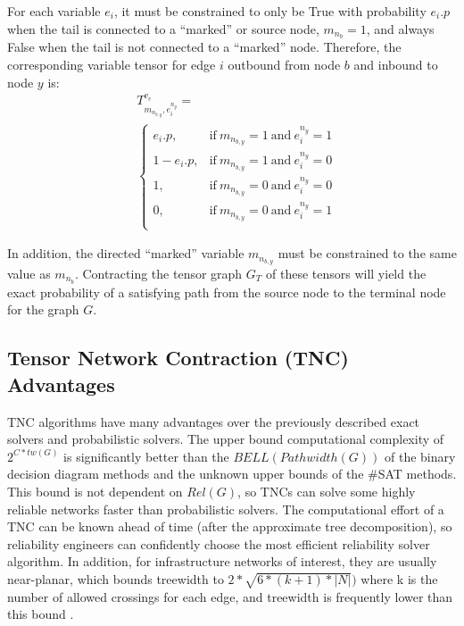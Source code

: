 For each variable \(e_i\), it must be constrained to only be True with probability \(e_i.p\) when the tail is connected to a ``marked'' or source node, \(m_{n_b}=1\), and always False when the tail is not connected to a ``marked'' node. Therefore, the corresponding variable tensor for edge \(i\) outbound from node \(b\) and inbound to node \(y\) is: \begin{equation*}
\begin{split}
& T^{v_e}_{m_{n_{b,y}},e_i^{n_y}}= \\
& \begin{cases}
  e_i.p, & \text{if}\ m_{n_{b,y}}=1\ \text{and}\ e_i^{n_y}=1 \\
  1-e_i.p, & \text{if}\ m_{n_{b,y}}=1\ \text{and}\ e_i^{n_y}=0 \\
  1, & \text{if}\ m_{n_{b,y}}=0\ \text{and}\ e_i^{n_y}=0 \\
  0, & \text{if}\ m_{n_{b,y}}=0\ \text{and}\ e_i^{n_y}=1 \\
\end{cases}
\end{split}
\end{equation*}

In addition, the directed ``marked'' variable \(m_{n_{b,y}}\) must be constrained to the same value as \(m_{n_b}\). Contracting the tensor graph \(G_T\) of these tensors will yield the exact probability of a satisfying path from the source node to the terminal node for the graph \(G\).

\hypertarget{tensor-network-contraction-tnc-advantages}{%
\subsection{Tensor Network Contraction (TNC) Advantages}\label{tensor-network-contraction-tnc-advantages}}

TNC algorithms have many advantages over the previously described exact solvers and probabilistic solvers. The upper bound computational complexity of \(2^{C*tw(G)}\) is significantly better than the \(BELL(Pathwidth(G))\) of the binary decision diagram methods and the unknown upper bounds of the \#SAT methods. This bound is not dependent on \(Rel(G)\), so TNCs can solve some highly reliable networks faster than probabilistic solvers. The computational effort of a TNC can be known ahead of time (after the approximate tree decomposition), so reliability engineers can confidently choose the most efficient reliability solver algorithm. In addition, for infrastructure networks of interest, they are usually near-planar, which bounds treewidth to \(2*\sqrt{6*(k+1)*|N|})\) \cite{dujmovic2017structure} where k is the number of allowed crossings for each edge, and treewidth is frequently lower than this bound \cite{maniu2019experimental}.


